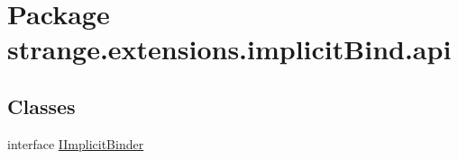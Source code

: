 \hypertarget{namespacestrange_1_1extensions_1_1implicit_bind_1_1api}{\section{Package strange.\-extensions.\-implicit\-Bind.\-api}
\label{namespacestrange_1_1extensions_1_1implicit_bind_1_1api}
}
\subsection*{Classes}
\begin{DoxyCompactItemize}
\item 
interface \hyperlink{interfacestrange_1_1extensions_1_1implicit_bind_1_1api_1_1_i_implicit_binder}{I\-Implicit\-Binder}
\end{DoxyCompactItemize}
